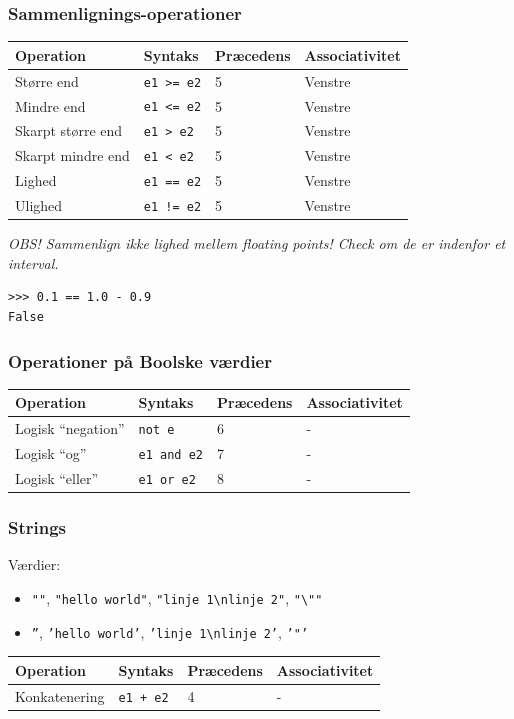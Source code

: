 \documentclass[10pt]{beamer}
\begin{document}
\begin{frame}[fragile]
  \frametitle{Sammenlignings-operationer}

  \begin{tabular}{llll}
    \toprule
    \textbf{Operation} & \textbf{Syntaks} & \textbf{Præcedens} & \textbf{Associativitet} \\
      \toprule
      Større end & \texttt{e1 >= e2} & 5 & Venstre\\
      Mindre end & \texttt{e1 <= e2} & 5 & Venstre\\
      Skarpt større end & \texttt{e1 > e2} & 5 & Venstre\\
      Skarpt mindre end & \texttt{e1 < e2} & 5 & Venstre\\
      Lighed & \texttt{e1 == e2} & 5 & Venstre\\
      Ulighed & \texttt{e1 != e2} & 5 & Venstre\\
    \bottomrule
  \end{tabular}

  \vspace{5mm}
  \textit{OBS! Sammenlign ikke lighed mellem floating points! Check om de er indenfor et interval.}

\begin{verbatim}
>>> 0.1 == 1.0 - 0.9
False
\end{verbatim}
\end{frame}


\begin{frame}
  \frametitle{Operationer på Boolske værdier}

  \begin{tabular}{llll}
    \toprule
    \textbf{Operation} & \textbf{Syntaks} & \textbf{Præcedens} & \textbf{Associativitet} \\
      \toprule
      Logisk ``negation'' & \texttt{not e} & 6 & -\\
      Logisk ``og'' & \texttt{e1 and e2} & 7 & -\\
      Logisk ``eller'' & \texttt{e1 or e2} & 8 & -\\
    \bottomrule
  \end{tabular}
\end{frame}

\begin{frame}
  \frametitle{Strings}

  Værdier:
  \begin{itemize}
  \item \texttt{""}, \texttt{"hello world"}, \texttt{"linje 1\textbackslash nlinje 2"}, \texttt{"\textbackslash""}
  \item \texttt{''}, \texttt{'hello world'}, \texttt{'linje 1\textbackslash nlinje 2'}, \texttt{'"'}
  \end{itemize}
\vspace{5mm}
  \begin{tabular}{llll}
    \toprule
    \textbf{Operation} & \textbf{Syntaks} & \textbf{Præcedens} & \textbf{Associativitet} \\
      \toprule
      Konkatenering & \texttt{e1 + e2} & 4 & -\\
    \bottomrule
  \end{tabular}


\end{frame}
\end{document}
